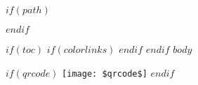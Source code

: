 \documentclass[a4paper,11pt]{article}
\begin{document}
$if(path)$

$endif$

$if(toc)$
{
    $if(colorlinks)$
    \hypersetup{linkcolor=$if(toccolor)$$toccolor$$else$$endif$}
    $endif$
    \setcounter{secnumdepth}{3}
    \setcounter{tocdepth}{$toc_depth$}
    \tableofcontents
  }
$endif$
\newpage
$body$
\vspace{10mm}

$if(qrcode)$
  \texttt{[image: \$qrcode\$]}
$endif$
\end{document}
